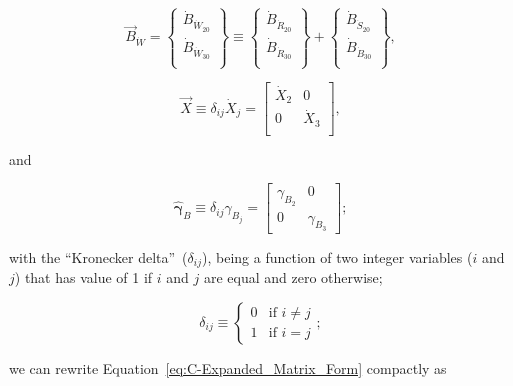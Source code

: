 \begin{equation} \label{eq:waste_vec_def}
	\vec{B}_{\dot{W}} 
	=
	\begin{Bmatrix}
		\dot{B}_{\dot{W}_{20}}	\\
		\dot{B}_{\dot{W}_{30}}	\\
	\end{Bmatrix}
	\equiv
	\begin{Bmatrix}
		\dot{B}_{\dot{R}_{20}}	\\
		\dot{B}_{\dot{R}_{30}}	\\
	\end{Bmatrix}
	+
	\begin{Bmatrix}
		\dot{B}_{\dot{S}_{20}}	\\
		\dot{B}_{\dot{B}_{30}}	\\
	\end{Bmatrix},
\end{equation}

\begin{equation} \label{eq:X_hat_matrix_def}
	\hat{\vec{X}} 
	\equiv
	\delta_{ij} \dot{X}_{j} 
	= 
	\begin{bmatrix}
		\dot{X}_{2}		&	0	  \\
		0				&	\dot{X}_{3}	\\
	\end{bmatrix},
\end{equation} 

\noindent{}and

\begin{equation} \label{eq:gamma_hat_matrix_def}
	\hat{\boldsymbol{\gamma}}_{B}
	\equiv
	\delta_{ij} \gamma_{B_{j}}
	=
	\begin{bmatrix}
		\gamma_{B_{2}} & 0         \\
		0              & \gamma_{B_{3}}
	\end{bmatrix};
\end{equation}

\noindent{}with the ``Kronecker delta''~($\delta_{ij}$),
being a function of two integer variables ($i$ and $j$)
that has value of 1 if $i$ and $j$ are equal and zero otherwise;

\begin{equation}\label{eq:k_delta}
	\delta_{ij} 
	\equiv
	\begin{cases}	
		0	&	\text{if  } i \neq j	\\
		1 	& 	\text{if  } i = j
	\end{cases};
\end{equation}

\noindent{}we can rewrite Equation~\ref{eq:C-Expanded_Matrix_Form}
compactly as

